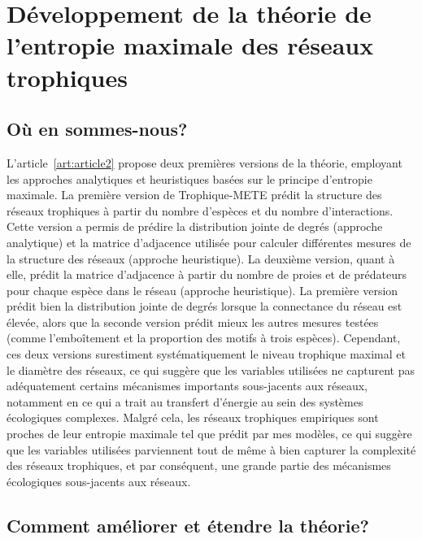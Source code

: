 
\section{Développement de la théorie de l'entropie maximale des réseaux trophiques} 

\subsection{Où en sommes-nous?} 

L'article~\ref{art:article2} propose deux premières versions de la théorie,
employant les approches analytiques et heuristiques basées sur le principe
d'entropie maximale. La première version de Trophique-METE prédit la structure
des réseaux trophiques à partir du nombre d'espèces et du nombre d'interactions.
Cette version a permis de prédire la distribution jointe de degrés (approche
analytique) et la matrice d'adjacence utilisée pour calculer différentes mesures
de la structure des réseaux (approche heuristique). La deuxième version, quant à
elle, prédit la matrice d'adjacence à partir du nombre de proies et de
prédateurs pour chaque espèce dans le réseau (approche heuristique). La première
version prédit bien la distribution jointe de degrés lorsque la connectance du
réseau est élevée, alors que la seconde version prédit mieux les autres mesures
testées (comme l'emboîtement et la proportion des motifs à trois espèces).
Cependant, ces deux versions surestiment systématiquement le niveau trophique
maximal et le diamètre des réseaux, ce qui suggère que les variables utilisées
ne capturent pas adéquatement certains mécanismes importants sous-jacents aux
réseaux, notamment en ce qui a trait au transfert d'énergie au sein des systèmes
écologiques complexes. Malgré cela, les réseaux trophiques empiriques sont
proches de leur entropie maximale tel que prédit par mes modèles, ce qui suggère
que les variables utilisées parviennent tout de même à bien capturer la
complexité des réseaux trophiques, et par conséquent, une grande partie des
mécanismes écologiques sous-jacents aux réseaux. 

\subsection{Comment améliorer et étendre la théorie?} 

